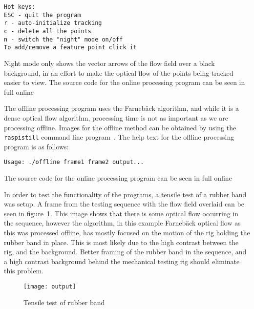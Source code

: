 \begin{verbatim}
Hot keys:
ESC - quit the program
r - auto-initialize tracking
c - delete all the points
n - switch the "night" mode on/off
To add/remove a feature point click it
\end{verbatim}

Night mode only shows the vector arrows of the flow field over a black background, in an effort to make the optical flow of the points being tracked easier to view. The source code for the online processing program can be seen in full online~\cite{github}

The offline processing program uses the Farnebäck algorithm, and while it is a dense optical flow algorithm, processing time is not as important as we are processing offline. Images for the offline method can be obtained by using the \verb|raspistill| command line program~\cite{raspistill}. The help text for the offline processing program is as follows:

\begin{verbatim}
Usage: ./offline frame1 frame2 output...
\end{verbatim}

The source code for the online processing program can be seen in full online~\cite{github}

In order to test the functionality of the programs, a tensile test of a rubber band was setup. A frame from the testing sequence with the flow field overlaid can be seen in figure~\ref{fig:instron}. This image shows that there is some optical flow occurring in the sequence, however the algorithm, in this example Farnebäck optical flow as this was processed offline, has mostly focused on the motion of the rig holding the rubber band in place. This is most likely due to the high contrast between the rig, and the background. Better framing of the rubber band in the sequence, and a high contrast background behind the mechanical testing rig should eliminate this problem.

\begin{figure}[h]
  \centering
  \texttt{[image: output]}
  \caption{Tensile test of rubber band}
  \label{fig:instron}
\end{figure}